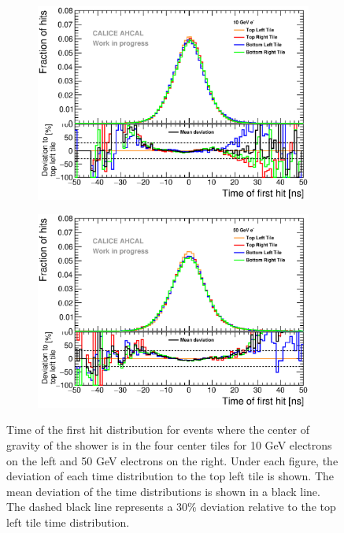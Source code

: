 \begin{figure}[htbp!]
	\begin{subfigure}[t]{0.49\textwidth}
		\centering
		\includegraphics[width=1\textwidth]{../Thesis_Plots/Timing/Electrons/Plots/Systematic_Inhomogeneity_10GeV.eps}
		\caption{}\label{fig:timing_syst_10GeV}
	\end{subfigure}
	\hfill
	\begin{subfigure}[t]{0.49\textwidth}
		\centering
		\includegraphics[width=1\textwidth]{../Thesis_Plots/Timing/Electrons/Plots/Systematic_Inhomogeneity_50GeV.eps}
		\caption{}\label{fig:timing_syst_50GeV}
	\end{subfigure}
	\caption{Time of the first hit distribution for events where the center of gravity of the shower is in the four center tiles for 10 GeV electrons on the left and 50 GeV electrons on the right. Under each figure, the deviation of each time distribution to the top left tile is shown. The mean deviation of the time distributions is shown in a black line. The dashed black line represents a 30\% deviation relative to the top left tile time distribution.} \label{fig:SystTimeElectrons}
\end{figure}


